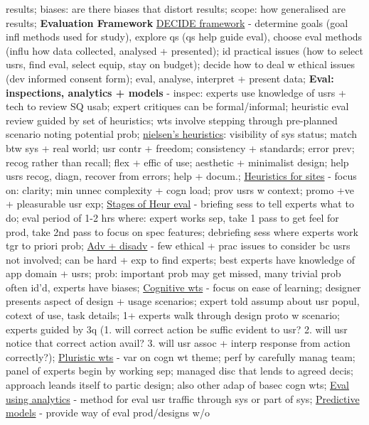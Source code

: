 \documentclass[a4paper]{article}
\begin{document}
\begin{multicols}{3}
        results; biases: are there biases that distort results; scope: how generalised are results; \newline \textbf{Evaluation Framework} \underline{DECIDE framework} - determine goals (goal infl methods used for study),
        explore qs (qs help guide eval), choose eval methods (influ how data collected, analysed + presented); id practical issues (how to select usrs, find eval, select equip, stay on budget); decide how to deal w ethical issues
        (dev informed consent form); eval, analyse, interpret + present data; \newline \textbf{Eval: inspections, analytics + models} - inspec: experts use knowledge of usrs + tech to review SQ usab; expert critiques can be
        formal/informal; heuristic eval review guided by set of heuristics; wts involve stepping through pre-planned scenario noting potential prob; \underline{nielsen's heuristics}: visibility of sys status;
        match btw sys + real world; usr contr + freedom; consistency + standards; error prev; recog rather than recall; flex + effic of use; aesthetic + minimalist design; help usrs recog, diagn, recover from errors;
        help + docum.; \underline{Heuristics for sites} - focus on: clarity; min unnec complexity + cogn load; prov usrs w context; promo +ve + pleasurable usr exp; \underline{Stages of Heur eval} - briefing sess to tell experts
        what to do; eval period of 1-2 hrs where: expert works sep, take 1 pass to get feel for prod, take 2nd pass to focus on spec features; debriefing sess where experts work tgr to priori prob; \underline{Adv + disadv} -
        few ethical + prac issues to consider bc usrs not involved; can be hard + exp to find experts; best experts have knowledge of app domain + usrs; prob: important prob may get missed, many trivial prob
        often id'd, experts have biases; \underline{Cognitive wts} - focus on ease of learning; designer presents aspect of design + usage scenarios; expert told assump about usr popul, cotext of use, task
        details; 1+ experts walk through design proto w scenario; experts guided by 3q (1. will correct action be suffic evident to usr? 2. will usr notice that correct action avail? 3. will usr assoc + interp
        response from action correctly?); \underline{Pluristic wts} - var on cogn wt theme; perf by carefully manag team; panel of experts begin by working sep; managed disc that lends to agreed decis; approach leands itself
        to partic design; also other adap of basec cogn wts; \underline{Eval using analytics} - method for eval usr traffic through sys or part of sys; \underline{Predictive models} - provide way of eval prod/designs w/o

\end{multicols}
\end{document}
